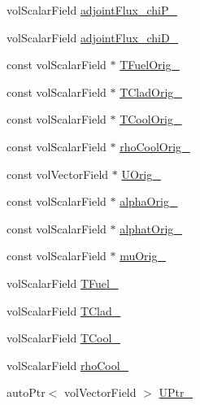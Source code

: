\begin{DoxyCompactItemize}
vol\+Scalar\+Field \hyperlink{classFoam_1_1adjointDiffusionNeutronics_a29406f72a126a39ac66162ee6212e1d4}{adjoint\+Flux\+\_\+chi\+P\+\_\+}
\item 
vol\+Scalar\+Field \hyperlink{classFoam_1_1adjointDiffusionNeutronics_a02176a2b9e8093950285800d791f61d7}{adjoint\+Flux\+\_\+chi\+D\+\_\+}
\item 
const vol\+Scalar\+Field $\ast$ \hyperlink{classFoam_1_1adjointDiffusionNeutronics_a871434fb035f6837b1b236a1ec520abc}{T\+Fuel\+Orig\+\_\+}
\item 
const vol\+Scalar\+Field $\ast$ \hyperlink{classFoam_1_1adjointDiffusionNeutronics_a9abfa8412a2bd9f5eab3df63b82e6272}{T\+Clad\+Orig\+\_\+}
\item 
const vol\+Scalar\+Field $\ast$ \hyperlink{classFoam_1_1adjointDiffusionNeutronics_a5997986d4c1a95752dfbf17e4d533cbc}{T\+Cool\+Orig\+\_\+}
\item 
const vol\+Scalar\+Field $\ast$ \hyperlink{classFoam_1_1adjointDiffusionNeutronics_a1da8adeb20ff6742068c9befe8b16f25}{rho\+Cool\+Orig\+\_\+}
\item 
const vol\+Vector\+Field $\ast$ \hyperlink{classFoam_1_1adjointDiffusionNeutronics_a92f1255350afa632167f9df0b8cd0d54}{U\+Orig\+\_\+}
\item 
const vol\+Scalar\+Field $\ast$ \hyperlink{classFoam_1_1adjointDiffusionNeutronics_a274c5fa5568001183ce2f40523b458f3}{alpha\+Orig\+\_\+}
\item 
const vol\+Scalar\+Field $\ast$ \hyperlink{classFoam_1_1adjointDiffusionNeutronics_a0b2a30a35ad577545e222153fd84d363}{alphat\+Orig\+\_\+}
\item 
const vol\+Scalar\+Field $\ast$ \hyperlink{classFoam_1_1adjointDiffusionNeutronics_a7fa28815680aa43e2c72f58a8eee9e43}{mu\+Orig\+\_\+}
\item 
vol\+Scalar\+Field \hyperlink{classFoam_1_1adjointDiffusionNeutronics_a40daf0cf699f5ce2bea8554707d8e11d}{T\+Fuel\+\_\+}
\item 
vol\+Scalar\+Field \hyperlink{classFoam_1_1adjointDiffusionNeutronics_a20ddcf74e7279560e0c7ce78d0319b93}{T\+Clad\+\_\+}
\item 
vol\+Scalar\+Field \hyperlink{classFoam_1_1adjointDiffusionNeutronics_af81c8770211826f576f6d7290a9f8103}{T\+Cool\+\_\+}
\item 
vol\+Scalar\+Field \hyperlink{classFoam_1_1adjointDiffusionNeutronics_af82ea76dc249b3661c882a65cba78a2c}{rho\+Cool\+\_\+}
\item 
auto\+Ptr$<$ vol\+Vector\+Field $>$ \hyperlink{classFoam_1_1adjointDiffusionNeutronics_a3f2bd9de379a4b68b01ed2da13922d86}{U\+Ptr\+\_\+}

\end{DoxyCompactItemize}
